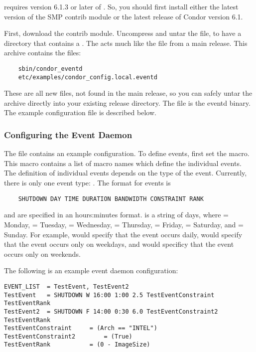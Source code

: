  requires version 6.1.3 or later of
.
So, you should first install either the latest version of the SMP
 contrib module or the latest release of Condor version
6.1.

First, download the  contrib module.
Uncompress and untar the file, to have a directory that
contains a .
The  acts much like the  file from
a main release.
This archive contains the files:
\begin{verbatim}
	sbin/condor_eventd
	etc/examples/condor_config.local.eventd
\end{verbatim}
These are all new files, not found in the main release, so you can
safely untar the archive directly into your existing release
directory.
The file  is the eventd binary.
The example configuration file is described below.

\subsubsection{\label{sec:EventD-Configuration}
Configuring the Event Daemon} 

The file  contains an
example configuration.
To define events, first set the  macro.
This macro contains a list of macro names which define the individual
events.
The definition of individual events depends on the type of the event.
Currently, there is only one event type: .
The format for  events is
\begin{verbatim}
	SHUTDOWN DAY TIME DURATION BANDWIDTH CONSTRAINT RANK
\end{verbatim}
\verb@TIME@ and \verb@DURATION@ are specified in an hours:minutes
format.  \verb@DAY@ is a string of days, where \verb@M@ = Monday,
\verb@T@ = Tuesday, \verb@W@ = Wednesday, \verb@R@ = Thursday,
\verb@F@ = Friday, \verb@S@ = Saturday, and \verb@U@ = Sunday.  For
example, \verb@MTWRFSU@ would specify that the event occurs daily,
\verb@MTWRF@ would specify that the event occurs only on weekdays, and
\verb@SU@ would specificy that the event occurs only on weekends.

The following is an example event daemon configuration:
\begin{verbatim}
EVENT_LIST	= TestEvent, TestEvent2
TestEvent	= SHUTDOWN W 16:00 1:00 2.5 TestEventConstraint TestEventRank
TestEvent2	= SHUTDOWN F 14:00 0:30 6.0 TestEventConstraint2 TestEventRank
TestEventConstraint		= (Arch == "INTEL")
TestEventConstraint2		= (True)
TestEventRank			= (0 - ImageSize)
\end{verbatim}

